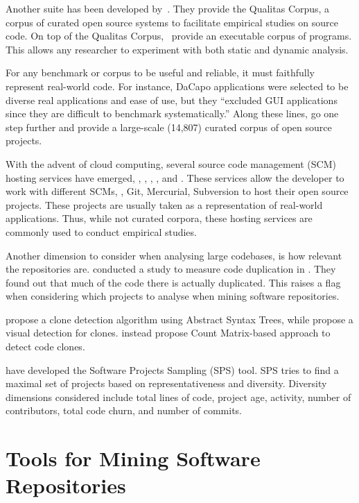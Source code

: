 Another suite has been developed by~\cite{temperoQualitasCorpusCurated2010}.
They provide the Qualitas Corpus, a corpus of curated open source systems to facilitate empirical studies on source code.
On top of the Qualitas Corpus,~\cite{dietrichXCorpusExecutableCorpus2017} provide an executable corpus of \java{} programs.
This allows any researcher to experiment with both static and dynamic analysis.

For any benchmark or corpus to be useful and reliable,
it must faithfully represent real-world code.
For instance,
DaCapo applications were selected to be diverse real applications and
ease of use, but they ``excluded GUI applications since they are difficult
to benchmark systematically.''
Along these lines, \cite{allamanisMiningSourceCode2013} go one step further and provide a large-scale (14,807) curated corpus of open source \java{} projects.

With the advent of cloud computing,
several source code management (SCM) hosting services have emerged, \eg{},
\github{}, \gitlab{}, \bitbucket{}, and \sourceforge{}.
These services allow the developer to work with different SCMs, \eg,
Git, Mercurial, Subversion to host their open source projects.
These projects are usually taken as a representation of
real-world applications.
Thus, while not curated corpora, these hosting services are
commonly used to conduct empirical studies.

Another dimension to consider when analysing large codebases, is how relevant the repositories are.
\cite{lopesDeJaVuMapCode2017} conducted a study to measure code duplication in \github{}.
They found out that much of the code there is actually duplicated.
This raises a flag when considering which projects to analyse when mining software repositories.

\cite{baxterCloneDetectionUsing1998} propose a clone detection algorithm using Abstract Syntax Trees,
while \cite{riegerVisualDetectionDuplicated} propose a visual detection for clones.
\cite{yuanCMCDCountMatrix2011,chenReplicationReproductionCode} instead propose Count Matrix-based approach to detect code clones.

\cite{nagappanDiversitySoftwareEngineering2013} have developed the Software Projects Sampling (SPS) tool.
SPS tries to find a maximal set of projects based on representativeness and diversity.
Diversity dimensions considered include total lines of code,
project age, activity, number of contributors, total code churn,
and number of commits.

\section{Tools for Mining Software Repositories}
\label{sec:literature-review:mining}

